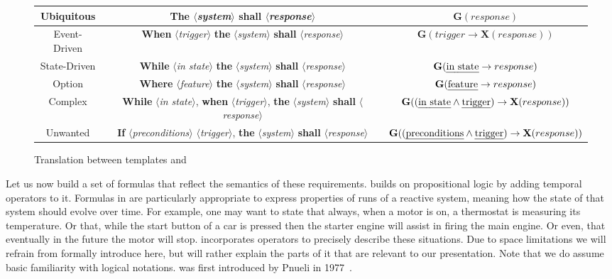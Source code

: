 \begin{figure}
\begin{tabular}{ |c|c|c| } 
 \hline
Ubiquitous & \textbf{The} $\langle$\emph{system}$\rangle$ \textbf{shall}
$\langle$\emph{response}$\rangle$ & $\mathbf{G}(response)$
\\
  \hline
Event-Driven & \textbf{When} $\langle$\emph{trigger}$\rangle$ \textbf{the}
$\langle$\emph{system}$\rangle$ \textbf{shall} $\langle$\emph{response}$\rangle$
& $\mathbf{G}(trigger\rightarrow \textbf{X}(response))$
\\
 \hline 
State-Driven &  \textbf{While} $\langle$\emph{in state}$\rangle$ \textbf{the}
$\langle$\emph{system}$\rangle$ \textbf{shall} $\langle$\emph{response}$\rangle$
& $\mathbf{G}(\text{\emph{in state}}\rightarrow response)$ \\
 \hline

Option &  \textbf{Where} $\langle$\emph{feature}$\rangle$ \textbf{the}
$\langle$\emph{system}$\rangle$ \textbf{shall} $\langle$\emph{response}$\rangle$
& $\mathbf{G}(\text{\emph{feature}}\rightarrow response)$ \\
 \hline
 
Complex &  \textbf{While} $\langle$\emph{in state}$\rangle$, \textbf{when}
$\langle$\emph{trigger}$\rangle$, \textbf{the} $\langle$\emph{system}$\rangle$
\textbf{shall} $\langle$\emph{response}$\rangle$ & $\mathbf{G}((\text{\emph{in
state}} \land \text{\emph{trigger}})\rightarrow \textbf{X}(response))$ \\
 \hline
 
Unwanted &  \textbf{If} $\langle$\emph{preconditions}$\rangle$
$\langle$\emph{trigger}$\rangle$, \textbf{the} $\langle$\emph{system}$\rangle$
\textbf{shall} $\langle$\emph{response}$\rangle$ &
$\mathbf{G}((\text{\emph{preconditions}} \land \text{\emph{trigger}})\rightarrow
\textbf{X}(response))$ \\
 \hline
 
\end{tabular}
\caption{Translation between \ears templates and \ltl}
\label{fig:translation_ears_ltl}
\end{figure}

Let us now build a set of \ltl formulas that reflect the semantics of these
requirements. \ltl builds on propositional logic by adding temporal operators to
it. Formulas in \ltl are particularly appropriate to express properties of
runs of a reactive system, meaning how the state of that system should evolve
over time. For example, one may want to state that always, when a motor is on,
a thermostat is measuring its temperature. Or that, while the start button of a
car is pressed then the starter engine will assist in firing the main engine. Or
even, that eventually in the future the motor will stop. \ltl incorporates
operators to precisely describe these situations. Due to space limitations we
will refrain from formally introduce \ltl here, but will rather explain
the parts of it that are relevant to our presentation. Note that we do
assume basic familiarity with logical notations. \ltl was first introduced by
Pnueli in 1977~\cite{Pnueli77}.

